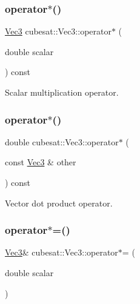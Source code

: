 \mbox{\label{structcubesat_1_1Vec3_af9b00c2ed0c783963023e4ceba5b1e1c}} 
\subsubsection{\texorpdfstring{operator$\ast$()}{operator*()}\hspace{0.1cm}{\footnotesize\ttfamily [1/2]}}
{\footnotesize\ttfamily \hyperlink{structcubesat_1_1Vec3}{Vec3} cubesat\+::\+Vec3\+::operator$\ast$ (\begin{DoxyParamCaption}\item[{double}]{scalar }\end{DoxyParamCaption}) const\hspace{0.3cm}{\ttfamily [inline]}}



Scalar multiplication operator. 

\mbox{\label{structcubesat_1_1Vec3_ad35576d2c80721fe0d19e3c00dc126bc}} 
\subsubsection{\texorpdfstring{operator$\ast$()}{operator*()}\hspace{0.1cm}{\footnotesize\ttfamily [2/2]}}
{\footnotesize\ttfamily double cubesat\+::\+Vec3\+::operator$\ast$ (\begin{DoxyParamCaption}\item[{const \hyperlink{structcubesat_1_1Vec3}{Vec3} \&}]{other }\end{DoxyParamCaption}) const\hspace{0.3cm}{\ttfamily [inline]}}



Vector dot product operator. 

\mbox{\label{structcubesat_1_1Vec3_a6ad7142feff2e98b1ab47d5892f5a5ee}} 
\subsubsection{\texorpdfstring{operator$\ast$=()}{operator*=()}}
{\footnotesize\ttfamily \hyperlink{structcubesat_1_1Vec3}{Vec3}\& cubesat\+::\+Vec3\+::operator$\ast$= (\begin{DoxyParamCaption}\item[{double}]{scalar }\end{DoxyParamCaption})\hspace{0.3cm}{\ttfamily [inline]}}



